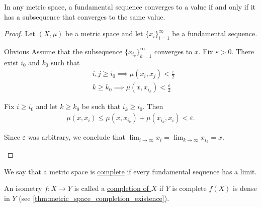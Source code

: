 \begin{proposition}\label{thm:fundamental_subsequence_convergence}
  In any metric space, a fundamental sequence converges to a value if and only if it has a subsequence that converges to the same value.
\end{proposition}
\begin{proof}
  Let $(X, \mu)$ be a metric space and let $\{ x_i \}_{i=1}^\infty$ be a fundamental sequence.

  \begin{description}
    \Implies Obvious
    \ImpliedBy Assume that the subsequence $\{ x_{i_k} \}_{k=1}^\infty$ converges to $x$. Fix $\varepsilon > 0$. There exist $i_0$ and $k_0$ such that
    \begin{align*}
      &i, j \geq i_0 \implies \mu(x_i, x_j) < \tfrac \varepsilon 2 \\
      &k \geq k_0 \implies \mu(x, x_{i_k}) < \tfrac \varepsilon 2
    \end{align*}

    Fix $i \geq i_0$ and let $k \geq k_0$ be such that $i_k \geq i_0$. Then
    \begin{align*}
      \mu(x, x_i) \leq \mu(x, x_{i_k}) + \mu(x_{i_k}, x_i) < \varepsilon.
    \end{align*}

    Since $\varepsilon$ was arbitrary, we conclude that $\lim_{i \to \infty} x_i = \lim_{k \to \infty} x_{i_k} = x$.
  \end{description}
\end{proof}

\begin{definition}\label{def:complete_metric_space}
  We say that a metric space is \ul{complete} if every fundamental sequence has a limit.

  An isometry $f: X \to Y$ is called a \ul{completion of $X$} if $Y$ is complete $f(X)$ is dense in $Y$ (see \cref{thm:metric_space_completion_existence}).
\end{definition}

